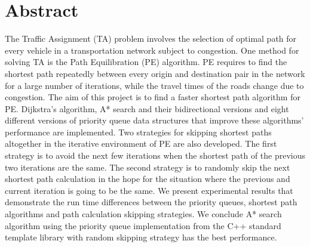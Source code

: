\chapter*{Abstract}
The Traffic Assignment (TA) problem involves the selection of optimal path for every vehicle in a transportation network subject to congestion.
One method for solving TA is the Path Equilibration (PE) algorithm.
PE requires to find the shortest path repeatedly between every origin and destination pair in the network for a large number of iterations,
while the travel times of the roads change due to congestion.
The aim of this project is to find a faster shortest path algorithm for PE.
Dijkstra's algorithm, A* search and their bidirectional versions and eight different versions of priority queue data structures that improve these algorithms' performance are implemented.
Two strategies for skipping shortest paths altogether in the iterative environment of PE are also developed.
The first strategy is to avoid the next few iterations when the shortest path of the previous two iterations are the same.
The second strategy is to randomly skip the next shortest path calculation in the hope for the situation where the previous and current iteration is going to be the same.
We present experimental results that demonstrate the run time differences between the priority queues, shortest path algorithms and path calculation skipping strategies.
We conclude A* search algorithm using the priority queue implementation from the C++ standard template library with random skipping strategy has the best performance.
